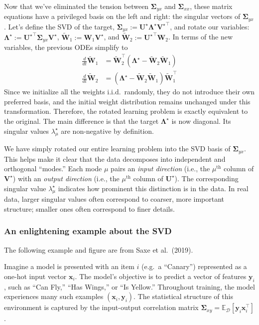 \documentclass[12pt]{article}
\newcommand{\vx}{\mathbf{x}}
\newcommand{\vy}{\mathbf{y}}
\newcommand{\mW}{\mathbf{W}}
\newcommand{\mU}{\mathbf{U}}
\newcommand{\mV}{\mathbf{V}}
\newcommand{\mLambda}{\boldsymbol{\Lambda}}
\newcommand{\mSigma}{\boldsymbol{\Sigma}}
\newcommand{\E}{\mathbb{E}}
\begin{document}
Now that we've eliminated the tension between $\mSigma_{yx}$ and $\mSigma_{xx}$, these matrix equations have a privileged basis on the left and right: the singular vectors of $\mSigma_{yx}$. Let's define the SVD of the target, $\mSigma_{yx} := \mU^\star \mLambda^\star {\mV^\star}^\top$, and rotate our variables: $\mLambda^\star:={\mU^\star}^\top \mSigma_{yx} \mV^\star$, $\tilde{\mW}_1 := \mW_1 \mV^\star$, and $\tilde{\mW}_2 := {\mU^\star}^\top \mW_2$. In terms of the new variables, the previous ODEs simplify to
\begin{align}
    \frac{d}{dt}\tilde{\mW}_1 &= \tilde{\mW}_2^\top(\mLambda^\star - \tilde{\mW}_2 \tilde{\mW}_1) \tag{3}\\
    \frac{d}{dt}\tilde{\mW}_2 &= (\mLambda^\star  - \tilde{\mW}_2 \tilde{\mW}_1) \tilde{\mW}_1^\top \tag{4}
\end{align}
Since we initialize all the weights i.i.d.\ randomly, they do not introduce their own preferred basis, and the initial weight distribution remains unchanged under this transformation. Therefore, the rotated learning problem is exactly equivalent to the original. The main difference is that the target $\mLambda^\star$ is now diagonal. Its singular values $\lambda^\star_\mu$ are non-negative by definition.

We have simply rotated our entire learning problem into the SVD basis of $\mSigma_{yx}$. This helps make it clear that the data decomposes into independent and orthogonal ``modes.'' Each mode $\mu$ pairs an \emph{input direction} (i.e., the $\mu^\mathrm{th}$ column of $\mV^\star$) with an \emph{output direction} (i.e., the $\mu^\mathrm{th}$ column of $\mU^\star$). The corresponding singular value $\lambda^\star_\mu$ indicates how prominent this distinction is in the data. In real data, larger singular values often correspond to coarser, more important structure; smaller ones often correspond to finer details.

\subsubsection*{An enlightening example about the SVD}

The following example and figure are from Saxe et al.\ (2019).

Imagine a model is presented with an item $i$ (e.g.\ a ``Canary'') represented as a one-hot input vector $\vx_i$. The model's objective is to predict a vector of features $\vy_i$, such as ``Can Fly,'' ``Has Wings,'' or ``Is Yellow.'' Throughout training, the model experiences many such examples $(\vx_i, \vy_i)$. The statistical structure of this environment is captured by the input-output correlation matrix $\mSigma_{xy} = \E_{\mathcal{D}}[ \vy_i\vx_i^\top ]$.
\end{document}
